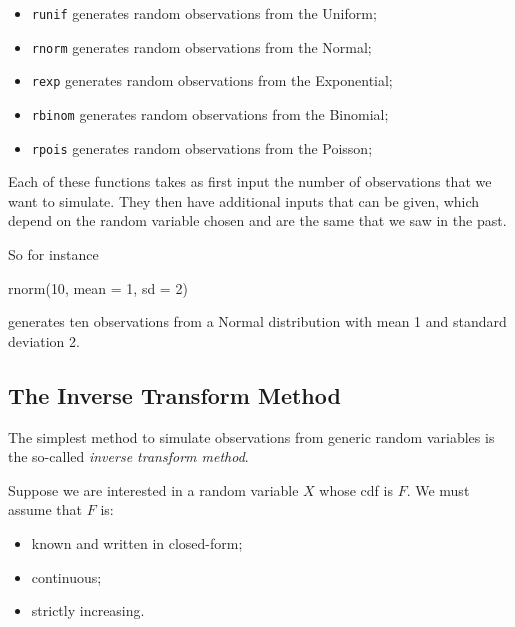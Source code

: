 \documentclass[
]{book}
\newenvironment{Shaded}{\begin{snugshade}}{\end{snugshade}}
\newcommand{\AttributeTok}[1]{\textcolor[rgb]{0.77,0.63,0.00}{#1}}
\newcommand{\DecValTok}[1]{\textcolor[rgb]{0.00,0.00,0.81}{#1}}
\newcommand{\FunctionTok}[1]{\textcolor[rgb]{0.00,0.00,0.00}{#1}}
\newcommand{\NormalTok}[1]{#1}
\theoremstyle{definition}
\theoremstyle{definition}
\theoremstyle{definition}
\theoremstyle{definition}
\theoremstyle{remark}
\begin{document}
\begin{itemize}
\item
  \texttt{runif} generates random observations from the Uniform;
\item
  \texttt{rnorm} generates random observations from the Normal;
\item
  \texttt{rexp} generates random observations from the Exponential;
\item
  \texttt{rbinom} generates random observations from the Binomial;
\item
  \texttt{rpois} generates random observations from the Poisson;
\end{itemize}

Each of these functions takes as first input the number of observations that we want to simulate. They then have additional inputs that can be given, which depend on the random variable chosen and are the same that we saw in the past.

So for instance

\begin{Shaded}
\begin{Highlighting}[]
\FunctionTok{rnorm}\NormalTok{(}\DecValTok{10}\NormalTok{, }\AttributeTok{mean =} \DecValTok{1}\NormalTok{, }\AttributeTok{sd =} \DecValTok{2}\NormalTok{)}
\end{Highlighting}
\end{Shaded}

generates ten observations from a Normal distribution with mean 1 and standard deviation 2.

\hypertarget{the-inverse-transform-method}{%
\subsection{The Inverse Transform Method}\label{the-inverse-transform-method}}

The simplest method to simulate observations from generic random variables is the so-called \emph{inverse transform method}.

Suppose we are interested in a random variable \(X\) whose cdf is \(F\). We must assume that \(F\) is:

\begin{itemize}
\item
  known and written in closed-form;
\item
  continuous;
\item
  strictly increasing.
\end{itemize}
\end{document}
